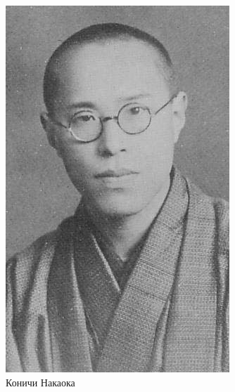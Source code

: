 \begin{figure}[h!tb] 
	\centering\includegraphics[scale=0.5]{Glava7/dTIP8624ZiE.jpg}
	\caption{Коничи Накаока}%
\end{figure}

